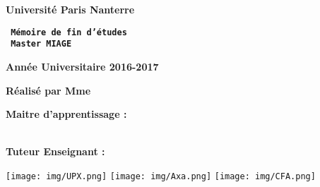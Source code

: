 \begin{titlepage}


\begin{center}
\color{white}
\begin{LARGE}
\vspace*{-1.5cm}
\textbf{\textsf{Université Paris Nanterre}}
\end{LARGE}
\end{center}


\vspace{-0.8cm}
\begin{center}
\fontsize{38}{70}\selectfont
\textbf{\texttt{       Mémoire de fin d’études \\ }}
\vspace{0.8cm}
\fontsize{42}{70}\selectfont
\textbf{\texttt{       Master  MIAGE}}
\end{center}
\vspace*{3cm}
\begin{center}
\begin{huge}
\textbf{\textsf{       Année Universitaire 2016-2017}}
\end{huge}
\end{center}



\vspace*{0.2cm}
\begin{center}
\color{white}
\fontsize{30}{35}\selectfont
\textbf{{       \TitreMemoire}}
\end{center}



\vspace*{0.4cm}
\begin{center}
\color{white}
\large
\hspace*{0.5cm}
\textbf{       Réalisé par Mme {\AuteurMemoire}}
\end{center}



\vspace*{1.5cm}
\color{blue}
\begin{normalsize}
\textbf{Maitre d’apprentissage : \\ }
\color{black}
\hspace*{0.5cm}
{\MaitreApp \\}
\vspace*{1cm}

\color{blue}
\textbf{Tuteur Enseignant : \\ }
\color{black}
\hspace*{0.5cm}
{\TuteurEns}
\end{normalsize}




\vspace*{3cm}
\texttt{[image: img/UPX.png]}
\hspace*{3.5cm}
\texttt{[image: img/Axa.png]}
\hspace*{3.5cm}
\texttt{[image: img/CFA.png]}

\end{titlepage}
\ClearShipoutPicture
